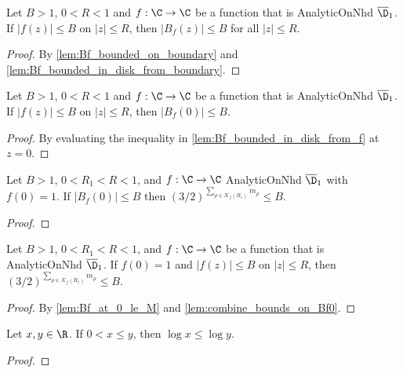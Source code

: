 \begin{lemma}\label{lem:Bf_bounded_in_disk_from_f}  \leanok
Let $B>1$, $0<R<1$ and $f:\C\to\C$ be a function that is AnalyticOnNhd $\overline{\D}_1$. If $|f(z)|\le B$ on $|z|\le R$, then $|B_f(z)|\le B$ for all $|z|\le R$.
\end{lemma}
\begin{proof} \leanok
{}
By \cref{lem:Bf_bounded_on_boundary} and \cref{lem:Bf_bounded_in_disk_from_boundary}.
\end{proof}

\begin{lemma}\label{lem:Bf_at_0_le_M}  \leanok
Let $B>1$, $0<R<1$ and $f:\C\to\C$ be a function that is AnalyticOnNhd $\overline{\D}_1$. If $|f(z)|\le B$ on $|z|\le R$, then $|B_f(0)|\le B$.
\end{lemma}
\begin{proof} \leanok
{}
By evaluating the inequality in \cref{lem:Bf_bounded_in_disk_from_f} at $z=0$.
\end{proof}

\begin{lemma}\label{lem:combine_bounds_on_Bf0}  \leanok
Let $B>1$, $0<R_1<R<1$, and $f:\C\to\C$ AnalyticOnNhd $\overline{\D}_1$ with $f(0)=1$. If $|B_f(0)|\le B$ then $(3/2)^{\sum_{\rho\in\mathcal K_f(R_1)} m_\rho} \le B$.
\end{lemma}
\begin{proof} \leanok
{}
\end{proof}

\begin{lemma}\label{lem:jensen_inequality_form}  \leanok
Let $B>1$, $0<R_1<R<1$, and $f:\C\to\C$ be a function that is AnalyticOnNhd $\overline{\D}_1$. If $f(0)=1$ and $|f(z)|\le B$ on $|z|\le R$, then $(3/2)^{\sum_{\rho\in\mathcal K_f(R_1)} m_\rho} \le B$.
\end{lemma}
\begin{proof} \leanok
{}
By \cref{lem:Bf_at_0_le_M} and \cref{lem:combine_bounds_on_Bf0}.
\end{proof}

\begin{lemma}\label{lem:log_mono_inc}  \leanok
Let $x,y \in \R$. If $0 < x \le y$, then $\log x \le \log y$.
\end{lemma}
\begin{proof} \leanok
\end{proof}

